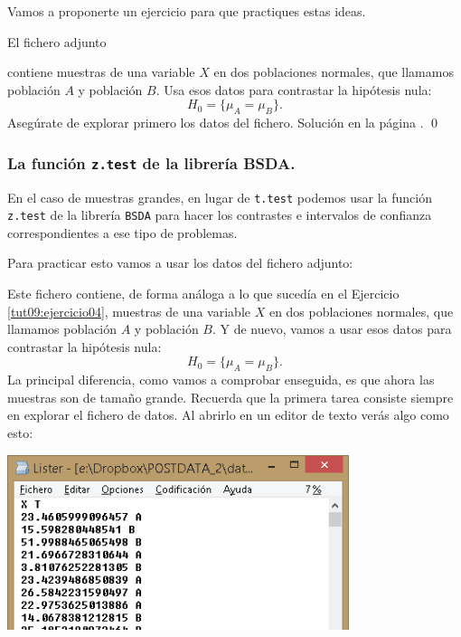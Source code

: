 \documentclass[10pt,a4paper]{article}\usepackage[]{graphicx}\usepackage[]{color}
\newcounter {cont01}
\begin{document}
{Vamos a proponerte un ejercicio para que practiques estas ideas.

\begin{ejercicio}
\label{tut09:ejercicio04}

El fichero adjunto

\begin{center}
\end{center}
contiene muestras de una variable $X$ en dos poblaciones normales, que llamamos población $A$ y población $B$. Usa esos datos para contrastar la hipótesis nula:
\[H_0 = \{\mu_A = \mu_B\}.\]
Asegúrate de explorar primero los datos del fichero.
Solución en la página \pageref{tut09:ejercicio04:sol}.
\qed
\end{ejercicio}

\subsubsection*{La función {\tt z.test} de la librería {BSDA}.}

En el caso de muestras grandes, en lugar de {\tt t.test} podemos usar la función {\tt z.test} de la librería {\tt BSDA} para hacer los contrastes e intervalos de confianza correspondientes a ese tipo de problemas.

Para practicar esto vamos a usar los datos del fichero adjunto:

\begin{center}
\end{center}
Este fichero contiene, de forma análoga a lo que sucedía en el Ejercicio \ref{tut09:ejercicio04}, muestras de una variable $X$ en dos poblaciones normales, que llamamos población $A$ y población $B$. Y de nuevo, vamos a usar esos datos para contrastar la hipótesis nula:
\[H_0 = \{\mu_A = \mu_B\}.\]
La principal diferencia, como vamos a comprobar enseguida, es que ahora las muestras son de tamaño grande. Recuerda que la primera tarea consiste siempre en explorar el fichero de datos. Al abrirlo en un editor de texto verás algo como esto:
\begin{center}
    \includegraphics[width=10cm]{../fig/Tut09-08.png}
\end{center}

}
\end{document}

